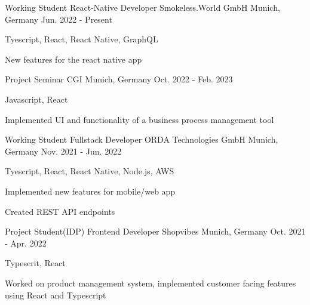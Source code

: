 

\begin{cventries}

  \cventry
  {Working Student React-Native Developer} %
  {Smokeless.World GmbH} %
  {Munich, Germany} %
  {Jun. 2022 - Present} %
  {
    \begin{cvitems} %
      \item {Tyescript, React, React Native, GraphQL}
      \item {New features for the react native app}
    \end{cvitems}
  }



  \cventry
  {Project Seminar} %
  {CGI} %
  {Munich, Germany} %
  {Oct. 2022 - Feb. 2023} %
  {
    \begin{cvitems} %
      \item {Javascript, React}
      \item {Implemented UI and functionality of a business process management tool}
    \end{cvitems}
  }



  \cventry
  {Working Student Fullstack Developer} %
  {ORDA Technologies GmbH} %
  {Munich, Germany} %
  {Nov. 2021 - Jun. 2022} %
  {
    \begin{cvitems} %
      \item {Tyescript, React, React Native, Node.js, AWS}
      \item {Implemented new features for mobile/web app}
      \item {Created REST API endpoints}
    \end{cvitems}
  }



  \cventry
  {Project Student(IDP) Frontend Developer} %
  {Shopvibes} %
  {Munich, Germany} %
  {Oct. 2021 - Apr. 2022} %
  {
    \begin{cvitems} %
      \item {Typescrit, React}
      \item {Worked on product management system, implemented customer facing features using React and Typescript}
    \end{cvitems}
  }
\end{cventries}
